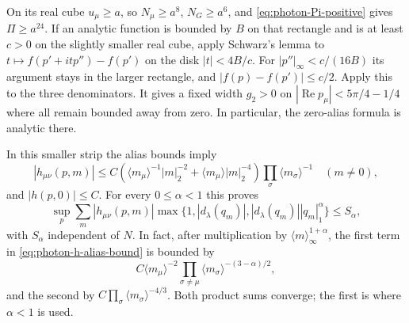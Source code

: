 On its real cube $u_\mu\ge a$, so
$N_\mu\ge a^8$, $N_G\ge a^6$, and
\eqref{eq:photon-Pi-positive} gives $\Pi\ge a^{24}$.
If an analytic function is bounded by $B$ on that rectangle and is
at least $c>0$ on the slightly smaller real cube, apply Schwarz's
lemma to $t\mapsto f(p'+itp'')-f(p')$ on the disk
$|t|<4B/c$. For $|p''|_\infty<c/(16B)$ its argument stays in the
larger rectangle, and $|f(p)-f(p')|\le c/2$.
Apply this to the three denominators. It gives a fixed width $g_2>0$
on $|\operatorname{Re}p_\mu|<5\pi/4-1/4$ where all remain
bounded away from zero. In particular, the zero-alias formula is
analytic there.

In this smaller strip the alias bounds imply
\begin{equation}\label{eq:photon-h-alias-bound}
 |h_{\mu\nu}(p,m)|\le C\left(
       \langle m_\mu\rangle^{-1}|m|_2^{-2}
          +\langle m_\mu\rangle|m|_2^{-4}\right)
                     \prod_\sigma\langle m_\sigma\rangle^{-1}
                 \quad(m\ne0),
\end{equation}
and $|h(p,0)|\le C$. For every $0\le\alpha<1$ this proves
\begin{equation}\label{eq:photon-alias-Holder-sum}
 \sup_p\sum_m|h_{\mu\nu}(p,m)|
       \max\{1,|d_\lambda(q_m)|,
                      |d_\lambda(q_m)||q_m|_1^\alpha\}\le S_\alpha,
\end{equation}
with $S_\alpha$ independent of $N$. In fact, after multiplication
by $\langle m\rangle_\infty^{1+\alpha}$, the first term in
\eqref{eq:photon-h-alias-bound} is bounded by
\[
 C\langle m_\mu\rangle^{-2}
            \prod_{\sigma\ne\mu}\langle m_\sigma\rangle^{-(3-\alpha)/2},
\]
and the second by $C\prod_\sigma\langle m_\sigma\rangle^{-4/3}$.
Both product sums converge; the first is where $\alpha<1$ is used.

